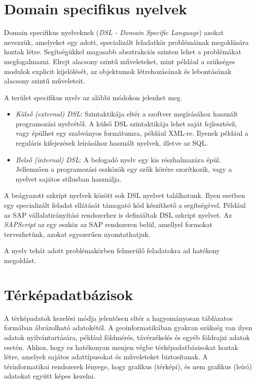 
\section{Domain specifikus nyelvek}

Domain specifikus nyelveknek (\textit{DSL - Domain Specific Language}) azokat nevezzük, amelyeket egy adott, specializált feladatkör problémáinak megoldására hoztak létre. Segítségükkel magasabb absztrakciós szinten lehet a problémákat megfogalmazni. Elrejt alacsony szintű műveleteket, mint például a szükséges modulok explicit kijelölését, az objektumok létrehozásának és lebontásának alacsony szintű műveleteit.

A terület specifikus nyelv az alábbi módokon jelenhet meg.

\begin{itemize}
\item \textit{Külső (external) DSL}: Szintaktikája eltér a szoftver megírásához használt programozási nyelvétől. A külső DSL szintaktikája lehet saját fejlesztésű, vagy épülhet egy szabványos formátumra, például XML-re. Ilyenek például a reguláris kifejezések leírásához használt nyelvek, illetve az SQL.
\item \textit{Belső (internal) DSL}: A befogadó nyelv egy kis részhalmazára épül. Jellemzően a programozási eszközök egy szűk körére szorítkozik, vagy a nyelvet sajátos stílusban használja.
\end{itemize}


A beágyazott szkript nyelvek között sok DSL nyelvet találhatunk. Ilyen esetben egy specializált feladat ellátását támogató kód készíthető a segítségével. Például az SAP vállalatirányítási rendszerhez is definiáltak  DSL szkript nyelvet. Az \textit{SAPScript} az egy eszköz az SAP rendszeren belül, amellyel formokat tervezhetünk, azokat egyszerűen nyomtathatjuk.

A nyelv tehát adott problémakörben felmerülő feladatokra ad hatékony megoldást.

\section{Térképadatbázisok}

A térképadatok kezelési módja jelentősen eltér a hagyományosan táblázatos formában ábrázolható adatokétól. A geoinformatikában gyakran szükség van ilyen adatok nyilvántartására, például földmérés, távérzékelés és egyéb földrajzi adatok esetén. Ahhoz, hogy ez hatékonyan menjen végbe térképadatbázisokat hoztak létre, amelyek sajátos adattípusokat és műveleteket biztosítanak.
A térinformatikai rendszerek lényege, hogy grafikus (térképi), és nem grafikus (leíró) adatokat együtt képes kezelni.

